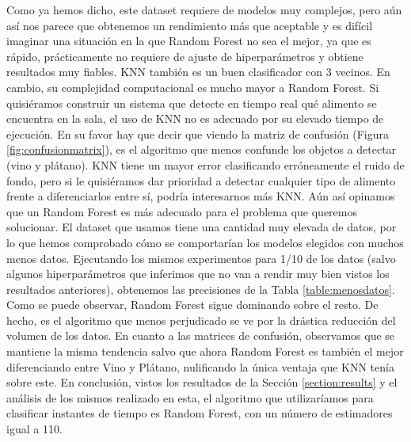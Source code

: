 \documentclass{esannV2}
\begin{document}
\newline\newline
Como ya hemos dicho, este dataset requiere de modelos muy complejos, pero aún así nos parece que obtenemos un rendimiento más que aceptable y es difícil imaginar una situación en la que Random Forest no sea el mejor, ya que es rápido, prácticamente no requiere de ajuste de hiperparámetros y obtiene resultados muy fiables.
\newline\newline
KNN también es un buen clasificador con 3 vecinos. En cambio, su complejidad computacional es mucho mayor a Random Forest. Si quisiéramos construir un sistema que detecte en tiempo real qué alimento se encuentra en la sala, el uso de KNN no es adecuado por su elevado tiempo de ejecución. En su favor hay que decir que viendo la matriz de confusión (Figura \ref{fig:confusionmatrix}), es el algoritmo que menos confunde los objetos a detectar (vino y plátano). KNN tiene un mayor error clasificando erróneamente el ruido de fondo, pero si le quisiéramos dar prioridad a detectar cualquier tipo de alimento frente a diferenciarlos entre sí, podría interesarnos más KNN. Aún así opinamos que un Random Forest es más adecuado para el problema que queremos solucionar.
\newline\newline
El dataset que usamos tiene una cantidad muy elevada de datos, por lo que hemos comprobado cómo se comportarían los modelos elegidos con muchos menos datos. Ejecutando los mismos experimentos para 1/10 de los datos (salvo algunos hiperparámetros que inferimos que no van a rendir muy bien vistos los resultados anteriores), obtenemos las precisiones de la Tabla \ref{table:menosdatos}. Como se puede observar, Random Forest sigue dominando sobre el resto. De hecho, es el algoritmo que menos perjudicado se ve por la drástica reducción del volumen de los datos. En cuanto a las matrices de confusión, observamos que se mantiene la misma tendencia salvo que ahora Random Forest es también el mejor diferenciando entre Vino y Plátano, nulificando la única ventaja que KNN tenía sobre este.
\newline\newline
En conclusión, vistos los resultados de la Sección \ref{section:results} y el análisis de los mismos realizado en esta, el algoritmo que utilizaríamos para clasificar instantes de tiempo es Random Forest, con un número de estimadores igual a 110.

\end{document}

